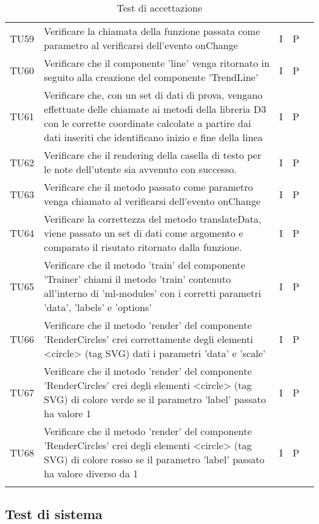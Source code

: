 \begin{longtable} {
		>{}p{15mm} 
		>{}p{79.5mm}
		>{}p{15mm} 
		>{}p{15mm}
		>{}p{0mm}}
	TU59	& Verificare la chiamata della funzione passata come parametro al verificarsi dell'evento onChange & I & P &\TBstrut \\ [2mm]
	TU60	& Verificare che il componente 'line' venga ritornato in seguito alla creazione del componente 'TrendLine' & I & P &\TBstrut \\ [2mm]
	TU61	& Verificare che, con un set di dati di prova, vengano effettuate delle chiamate ai metodi della libreria D3 con le corrette coordinate calcolate a partire dai dati inseriti che identificano inizio e fine della linea & I & P &\TBstrut \\ [2mm]
	TU62	& Verificare che il rendering della casella di testo per le note dell'utente sia avvenuto con successo. & I & P &\TBstrut \\ [2mm]
	TU63	& Verificare che il metodo passato come parametro venga chiamato al verificarsi dell'evento onChange & I & P &\TBstrut \\ [2mm]
	TU64	& Verificare la correttezza del metodo translateData, viene passato un set di dati come argomento e comparato il risutato ritornato dalla funzione. & I & P &\TBstrut \\ [2mm]
	TU65	& Verificare che il metodo 'train' del componente 'Trainer' chiami il metodo 'train' contenuto all'interno di 'ml-modules' con i corretti parametri 'data', 'labels' e 'options' & I & P &\TBstrut \\ [2mm]
	TU66	& Verificare che il metodo 'render' del componente 'RenderCircles' crei correttamente degli elementi <circle> (tag SVG) dati i parametri 'data' e 'scale' & I & P &\TBstrut \\ [2mm]
	TU67	& Verificare che il metodo 'render' del componente 'RenderCircles' crei degli elementi <circle> (tag SVG) di colore verde se il parametro 'label' passato ha valore 1 & I & P &\TBstrut \\ [2mm]
	TU68	& Verificare che il metodo 'render' del componente 'RenderCircles' crei degli elementi <circle> (tag SVG) di colore rosso se il parametro 'label' passato ha valore diverso da 1 & I & P &\TBstrut \\ [2mm]
	\rowcolor{white}
	\caption{Test di accettazione}
\end{longtable}


\subsection{Test di sistema}

